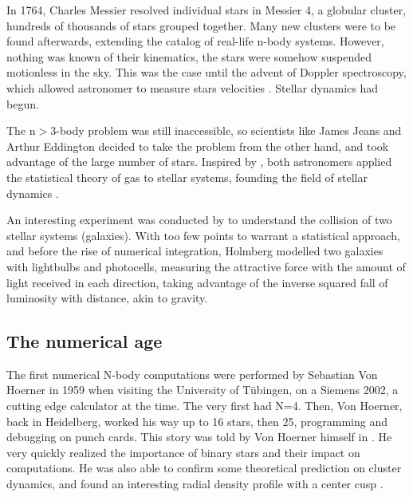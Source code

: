 In 1764, Charles Messier resolved individual stars in Messier 4, a globular cluster, hundreds of thousands of stars grouped together. Many new clusters were to be found afterwards, extending the catalog of real-life n-body systems. However, nothing was known of their kinematics, the stars were somehow suspended motionless in the sky. This was the case until the advent of Doppler spectroscopy, which allowed astronomer to measure stars velocities \citep{Doppler1842}. Stellar dynamics had begun.

The n$>$3-body problem was still inaccessible, so scientists like James Jeans and Arthur Eddington decided to take the problem from the other hand, and took advantage of the large number of stars. Inspired by \cite{Poincare1906}, both astronomers applied the statistical theory of gas to stellar systems, founding the field of stellar dynamics \citep{Jeans1916,Eddington1916}.

An interesting experiment was conducted by \cite{Holmberg1941} to understand the collision of two stellar systems (galaxies). With too few points to warrant a statistical approach, and before the rise of numerical integration, Holmberg modelled two galaxies with lightbulbs and photocells, measuring the attractive force with the amount of light received in each direction, taking advantage of the inverse squared fall of luminosity with distance, akin to gravity.

\subsection{The numerical age}

The first numerical N-body computations were performed by Sebastian Von Hoerner in 1959 when visiting the University of T\"ubingen, on a Siemens 2002, a cutting edge calculator at the time. The very first had N=4. Then, Von Hoerner, back in Heidelberg, worked his way up to 16 stars, then 25, programming and debugging on punch cards. This story was told by Von Hoerner himself in \cite{VonHoerner2001}. He very quickly realized the importance of binary stars and their impact on computations. He was also able to confirm some theoretical prediction on cluster dynamics, and found an interesting radial density profile with a center cusp \citep{VonHoerner1960,VonHoerner1963}.

